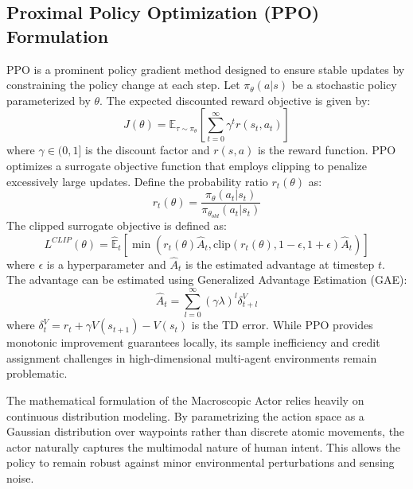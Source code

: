 \documentclass[conference]{IEEEtran}
\begin{document}
\subsection{Proximal Policy Optimization (PPO) Formulation}
PPO is a prominent policy gradient method designed to ensure stable updates by constraining the policy change at each step. Let $\pi_\theta(a|s)$ be a stochastic policy parameterized by $\theta$. The expected discounted reward objective is given by:
\begin{equation}
J(\theta) = \mathbb{E}_{\tau \sim \pi_\theta} \left[ \sum_{t=0}^\infty \gamma^t r(s_t, a_t) \right]
\end{equation}
where $\gamma \in (0,1]$ is the discount factor and $r(s,a)$ is the reward function. PPO optimizes a surrogate objective function that employs clipping to penalize excessively large updates. Define the probability ratio $r_t(\theta)$ as:
\begin{equation}
r_t(\theta) = \frac{\pi_\theta(a_t|s_t)}{\pi_{\theta_{old}}(a_t|s_t)}
\end{equation}
The clipped surrogate objective is defined as:
\begin{equation}
L^{CLIP}(\theta) = \hat{\mathbb{E}}_t \left[ \min( r_t(\theta)\hat{A}_t, \text{clip}(r_t(\theta), 1-\epsilon, 1+\epsilon)\hat{A}_t ) \right]
\end{equation}
where $\epsilon$ is a hyperparameter and $\hat{A}_t$ is the estimated advantage at timestep $t$. The advantage can be estimated using Generalized Advantage Estimation (GAE):
\begin{equation}
\hat{A}_t = \sum_{l=0}^\infty (\gamma \lambda)^l \delta_{t+l}^V
\end{equation}
where $\delta_t^V = r_t + \gamma V(s_{t+1}) - V(s_t)$ is the TD error. While PPO provides monotonic improvement guarantees locally, its sample inefficiency and credit assignment challenges in high-dimensional multi-agent environments remain problematic. 

The mathematical formulation of the Macroscopic Actor relies heavily on continuous distribution modeling. By parametrizing the action space as a Gaussian distribution over waypoints rather than discrete atomic movements, the actor naturally captures the multimodal nature of human intent. This allows the policy to remain robust against minor environmental perturbations and sensing noise.
\end{document}
